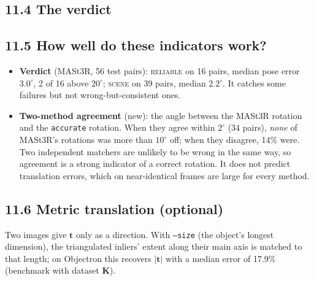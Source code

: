 \documentclass[11pt,a4paper]{article}
\newcommand{\tv}{\mathbf{t}}
\newcommand{\K}{\mathbf{K}}
\begin{document}
\subsection*{11.4 The verdict}
\begin{table}[H]\centering\small
{}
\end{table}

\subsection*{11.5 How well do these indicators work?}
\begin{itemize}
  \item \textbf{Verdict} (MASt3R, 56 test pairs): \textsc{reliable} on 16 pairs, median pose error $3.0^\circ$, 2 of 16 above $20^\circ$; \textsc{scene} on 39 pairs, median $2.2^\circ$. It catches some failures but not wrong-but-consistent ones.
  \item \textbf{Two-method agreement} (new): the angle between the MASt3R rotation and the \texttt{accurate} rotation. When they agree within $2^\circ$ (34 pairs), \emph{none} of MASt3R's rotations was more than $10^\circ$ off; when they disagree, 14\% were. Two independent matchers are unlikely to be wrong in the same way, so agreement is a strong indicator of a correct rotation. It does not predict translation errors, which on near-identical frames are large for every method.
\end{itemize}

\subsection*{11.6 Metric translation (optional)}
Two images give $\tv$ only as a direction. With \texttt{--size} (the object's longest dimension), the triangulated inliers' extent along their main axis is matched to that length; on Objectron this recovers $|\tv|$ with a median error of 17.9\% (benchmark with dataset $\K$).
\end{document}
